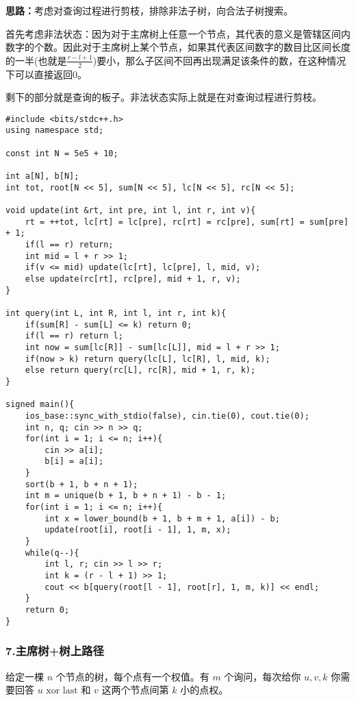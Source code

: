 \documentclass[]{article}
\begin{document}
\textbf{思路：}考虑对查询过程进行剪枝，排除非法子树，向合法子树搜索。

首先考虑非法状态：因为对于主席树上任意一个节点，其代表的意义是管辖区间内数字的个数。因此对于主席树上某个节点，如果其代表区间数字的数目比区间长度的一半(也就是\(\frac{r - l + 1}{2}\))要小，那么子区间不回再出现满足该条件的数，在这种情况下可以直接返回\(0\)。

剩下的部分就是查询的板子。非法状态实际上就是在对查询过程进行剪枝。

\begin{verbatim}
#include <bits/stdc++.h>
using namespace std;

const int N = 5e5 + 10;

int a[N], b[N];
int tot, root[N << 5], sum[N << 5], lc[N << 5], rc[N << 5];

void update(int &rt, int pre, int l, int r, int v){
    rt = ++tot, lc[rt] = lc[pre], rc[rt] = rc[pre], sum[rt] = sum[pre] + 1;
    if(l == r) return;
    int mid = l + r >> 1;
    if(v <= mid) update(lc[rt], lc[pre], l, mid, v);
    else update(rc[rt], rc[pre], mid + 1, r, v);
}

int query(int L, int R, int l, int r, int k){
    if(sum[R] - sum[L] <= k) return 0;
    if(l == r) return l;
    int now = sum[lc[R]] - sum[lc[L]], mid = l + r >> 1;
    if(now > k) return query(lc[L], lc[R], l, mid, k);
    else return query(rc[L], rc[R], mid + 1, r, k);
}

signed main(){
    ios_base::sync_with_stdio(false), cin.tie(0), cout.tie(0);
    int n, q; cin >> n >> q;
    for(int i = 1; i <= n; i++){
        cin >> a[i];
        b[i] = a[i];
    }
    sort(b + 1, b + n + 1);
    int m = unique(b + 1, b + n + 1) - b - 1;
    for(int i = 1; i <= n; i++){
        int x = lower_bound(b + 1, b + m + 1, a[i]) - b;
        update(root[i], root[i - 1], 1, m, x);
    }
    while(q--){
        int l, r; cin >> l >> r;
        int k = (r - l + 1) >> 1;
        cout << b[query(root[l - 1], root[r], 1, m, k)] << endl;
    }
    return 0;
}
\end{verbatim}

\hypertarget{ux4e3bux5e2dux6811ux6811ux4e0aux8defux5f84}{%
\subsubsection{7.主席树+树上路径}\label{ux4e3bux5e2dux6811ux6811ux4e0aux8defux5f84}}

给定一棵 \(n\) 个节点的树，每个点有一个权值。有 \(m\) 个询问，每次给你
\(u,v,k\) 你需要回答 \(u \text{ xor last}\) 和 \(v\) 这两个节点间第
\(k\) 小的点权。
\end{document}
